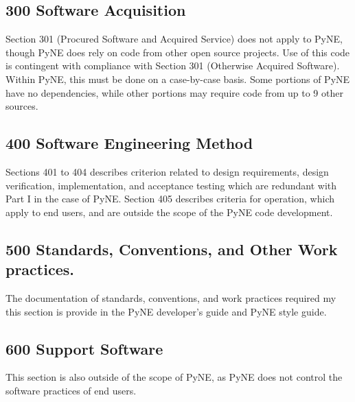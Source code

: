 \documentclass{anstrans}
\begin{document}
\subsection{300 Software Acquisition}

Section 301 (Procured Software and Acquired Service) does not apply to PyNE,
though PyNE does rely on code from other open source projects. Use of this code
is contingent with compliance with Section 301 (Otherwise Acquired Software).
Within PyNE, this must be done on a case-by-case basis. Some portions of PyNE
have no dependencies, while other portions may require code from up to 9 other
sources. 



\subsection{400 Software Engineering Method}

Sections 401 to 404 describes criterion related to design requirements, design
verification, implementation, and acceptance testing which are redundant with
Part I in the case of PyNE. Section 405 describes criteria for operation, which
apply to end users, and are outside the scope of the PyNE code development.


\subsection{500 Standards, Conventions, and Other Work practices.}

The documentation of standards, conventions, and work practices required my
this section is provide in the PyNE developer's guide and PyNE style guide.

\subsection{600 Support Software}
This section is also outside of the scope of PyNE, as PyNE does not control the software practices of end users.
\end{document}
